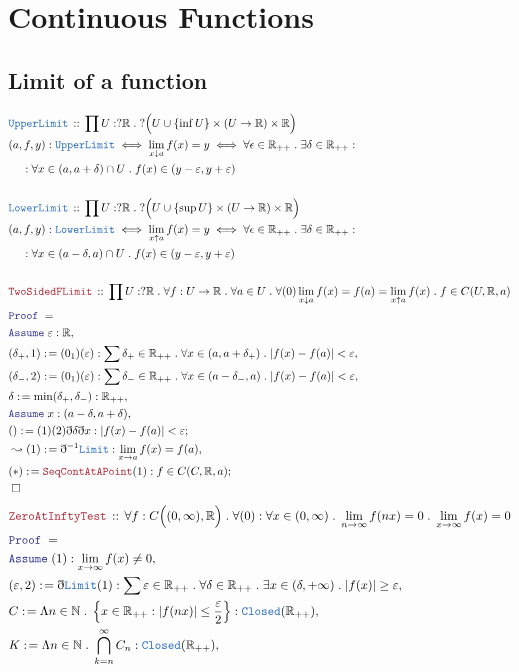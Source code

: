 \documentclass[12pt]{scrartcl}
\newcommand{\TYPE}[1]{\textcolor{NavyBlue}{\mathtt{#1}}}
\newcommand{\LOGIC}[1]{\textcolor{Blue}{\mathtt{#1}}}
\newcommand{\THM}[1]{\textcolor{Maroon}{\mathtt{#1}}}
\renewcommand{\.}{\; . \;}
\newcommand{\de}{: \kern 0.1pc =}
\newcommand{\Theorem}[2]{& \THM{#1} \, :: \, #2 \\ & \Proof = \\ }
\newcommand{\DeclareType}[2]{& \TYPE{#1} \, :: \, #2 \\}
\newcommand{\DefineNamedType}[4]{& #1 : \TYPE{#2} \iff #3 \iff #4 \\}
\newcommand{\NewLine}{\\ & \kern 1pc}
\newcommand{\Page}[1]{ \begin{align*} #1 \end{align*}   }
\newcommand{ \bd }{ \ByDef }
\newcommand{\Reals}{\mathbb{R} }
\newcommand{\Nat}{\mathbb{N} }
\newcommand{\Say}[3]{& #1 \de #2 : #3, \\}
\newcommand{\Conclude}[3]{& #1 \de #2 : #3; \\}
\newcommand{\Derive}[3]{& \leadsto #1 \de #2 : #3, \\}
\newcommand{\Assume}[2]{& \LOGIC{Assume} \;#1 : #2, \\}
\newcommand{\QED}{\; \square}
\newcommand{\EndProof}{& \QED \\}
\newcommand{\ByDef}{\eth}
\newcommand{\Proof}{\LOGIC{Proof} \; }
\begin{document}
\section{Continuous Functions}
\subsection{Limit of a function}
\Page{
	\DeclareType{UpperLimit}{  \prod U : ?\Reals \.  ?\Big(U \cup \{ \inf U \} \times (U \to \Reals) \times \Reals \Big) }
	\DefineNamedType{(a,f,y)}{UpperLimit}{ \lim_{x \downarrow a} f(x) = y  }
	{ \forall \epsilon \in \Reals_{++} \. \exists \delta \in \Reals_{++} :
		\NewLine :
		\forall x \in (a,a + \delta) \cap U \.   f(x) \in (y - \varepsilon, y + \varepsilon) 
	}
	\\
	\DeclareType{LowerLimit}{  \prod U : ?\Reals \.  ?\Big(U \cup \{ \sup U \} \times (U \to \Reals) \times \Reals \Big) }
	\DefineNamedType{(a,f,y)}{LowerLimit}{ \lim_{x \uparrow a} f(x) = y  }
	{ \forall \epsilon \in \Reals_{++} \. \exists \delta \in \Reals_{++} :
		\NewLine :
		\forall x \in ( a - \delta, a) \cap U \.   f(x) \in (y - \varepsilon, y + \varepsilon) 
	}
	\\
	\Theorem{TwoSidedFLimit}{\prod U : ?\Reals \.  \forall f : U \to \Reals \. \forall a \in U \.
		\forall (0) \lim_{x \downarrow a} f(x) = f(a) = \lim_{x \uparrow a} f(x) \. f \in C(U,\Reals,a)  }
	\Assume{\varepsilon}{\Reals}
	\Say{(\delta_+,1)}{(0_1)(\varepsilon)}{ \sum \delta_+ \in \Reals_{++} \.  
		\forall x \in (a,a + \delta_+) \. |f(x) - f(a)| < \varepsilon  }
	\Say{(\delta_-,2)}{(0_1)(\varepsilon)}{ \sum \delta_- \in \Reals_{++} \.  
		\forall x \in (a - \delta_-,a ) \. |f(x) - f(a)| < \varepsilon  }
	\Say{\delta}{\min(\delta_+,\delta_-)}{\Reals_{++}}
	\Assume{x}{ (a - \delta,a + \delta) }
	\Conclude{()}{(1)(2)\bd \delta \bd x}{|f(x) - f(a)| < \varepsilon}
	\Derive{(1)}{\bd^{-1}\TYPE{Limit}}{\lim_{x \to a} f(x) = f(a)}
	\Conclude{(*)}{\THM{SeqContAtAPoint}(1)}{f \in C(C,\Reals,a)}
	\EndProof
}\Page{
	\Theorem{ZeroAtInftyTest}{\forall f : C\Big( (0,\infty), \Reals \Big) \. \forall (0) : \forall  
		x \in (0,\infty) \. \lim_{n \to \infty} f(nx) = 0 \.    
		\lim_{x \to \infty} f(x) = 0 
	}
	\Assume{(1)}{\lim_{x \to \infty} f(x) \neq 0}
	\Say{(\varepsilon,2)}{\bd \TYPE{Limit}(1)}{\sum \varepsilon \in \Reals_{++} \. \forall \delta \in \Reals_{++} \.
		\exists x \in (\delta,+\infty) \.  |f(x)| \ge \varepsilon
	}
	\Say{C}{ \Lambda n \in \Nat \. \left\{ x \in \Reals_{++} :  | f(nx) | \le \frac{\varepsilon}{2}   \right\} }
	{ \TYPE{Closed}(\Reals_{++})  }
	\Say{K}{\Lambda n \in \Nat \. \bigcap_{k = n}^\infty C_n}{\TYPE{Closed}(\Reals_{++})}
}
\end{document}
